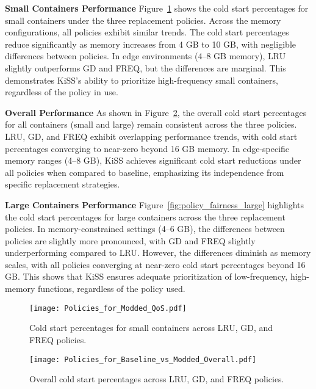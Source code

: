 \noindent\textbf{Small Containers Performance}  
Figure~\ref{fig:policy_fairness_small} shows the cold start percentages for small containers under the three replacement policies. Across the memory configurations, all policies exhibit similar trends. The cold start percentages reduce significantly as memory increases from 4 GB to 10 GB, with negligible differences between policies. In edge environments (4–8 GB memory), LRU slightly outperforms GD and FREQ, but the differences are marginal. This demonstrates KiSS’s ability to prioritize high-frequency small containers, regardless of the policy in use.

\noindent\textbf{Overall Performance}  
As shown in Figure~\ref{fig:policy_overall}, the overall cold start percentages for all containers (small and large) remain consistent across the three policies. LRU, GD, and FREQ exhibit overlapping performance trends, with cold start percentages converging to near-zero beyond 16 GB memory. In edge-specific memory ranges (4–8 GB), KiSS achieves significant cold start reductions under all policies when compared to baseline, emphasizing its independence from specific replacement strategies.

\noindent\textbf{Large Containers Performance}  
Figure~\ref{fig:policy_fairness_large} highlights the cold start percentages for large containers across the three replacement policies. In memory-constrained settings (4–6 GB), the differences between policies are slightly more pronounced, with GD and FREQ slightly underperforming compared to LRU. However, the differences diminish as memory scales, with all policies converging at near-zero cold start percentages beyond 16 GB. This shows that KiSS ensures adequate prioritization of low-frequency, high-memory functions, regardless of the policy used.

\begin{figure}[h]
    \centering
    \texttt{[image: Policies\_for\_Modded\_QoS.pdf]}
    \caption{Cold start percentages for small containers across LRU, GD, and FREQ policies.}
    \label{fig:policy_fairness_small}
\end{figure}

\begin{figure}[h]
    \centering
    \texttt{[image: Policies\_for\_Baseline\_vs\_Modded\_Overall.pdf]}
    \caption{Overall cold start percentages across LRU, GD, and FREQ policies.}
    \label{fig:policy_overall}
\end{figure}

